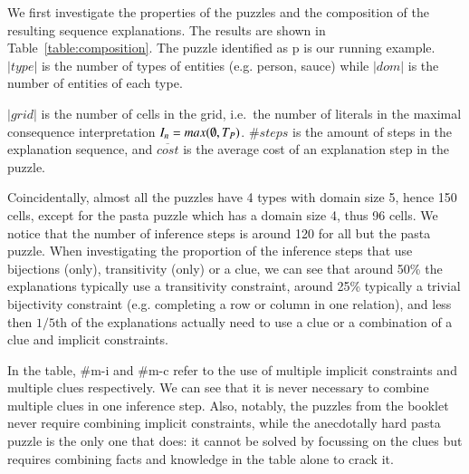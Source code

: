 We first investigate the properties of the puzzles and the composition of the resulting sequence explanations. The results are shown in Table~\ref{table:composition}.
The puzzle identified as p is our running example.
$|type|$ is the number of types of entities (e.g. person, sauce) while $|dom|$ is the number of entities of each type.

$|grid|$ is the number of cells in the grid, i.e.\ the number of literals in the maximal consequence interpretation $I_n=max(\emptyset, T_P)$. $\# steps$ is the amount of steps in the explanation sequence, and $\overline{cost}$ is the average cost of an explanation step in the puzzle.

Coincidentally, almost all the puzzles have 4 types with domain size 5,  hence 150 cells, except for the pasta puzzle which has a domain size 4, thus 96 cells.
We notice that the number of inference steps is around 120 for all but the pasta puzzle.
When investigating the proportion of the inference steps that use bijections (only), transitivity (only) or a clue, we can see that around 50\% the explanations typically use a transitivity constraint, around 25\% typically a trivial bijectivity constraint (e.g. completing a row or column in one relation), and less then $1/5$th of the explanations actually need to use a clue or a combination of a clue and implicit constraints.

In the table, \#m-i and \#m-c refer to the use of multiple implicit constraints and multiple clues respectively.
We can see that it is never necessary to combine multiple clues in one inference step.
Also, notably, the puzzles from the booklet never require combining implicit constraints, while the anecdotally hard pasta puzzle is the only one that does: it cannot be solved by focussing on the clues but requires combining facts and knowledge in the table alone to crack it.

